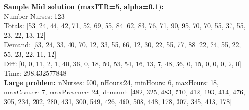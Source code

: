 \documentclass[11pt]{article}
\begin{document}
\noindent\footnotesize{\textbf{Sample Mid solution (maxITR=5, alpha=0.1):}\\
Number Nurses: 123\\
Totals: [53, 24, 44, 42, 71, 52, 69, 55, 84, 62, 83, 76, 71, 90, 95, 70, 70, 55, 37, 55, 23, 22, 13, 12]\\
Demand: [53, 24, 33, 40, 70, 12, 33, 55, 66, 12, 30, 22, 55, 77, 88, 22, 34, 55, 22, 55, 23, 22, 11, 12]\\
Diff: [0, 0, 11, 2, 1, 40, 36, 0, 18, 50, 53, 54, 16, 13, 7, 48, 36, 0, 15, 0, 0, 0, 2, 0]\\
Time: 298.432577848}\\

\noindent\normalsize{\textbf{Large problem:}
nNurses: 900,
nHours:24,
minHours: 6,
maxHours: 18,
maxConsec: 7,
maxPresence: 24,
demand: [482, 325, 483, 510, 412, 193, 414, 476, 305, 234, 202,
					280, 431, 300, 549, 426, 460, 508, 448, 178, 307, 345, 413, 178]}



\end{document}
